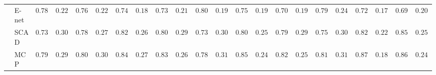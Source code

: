 \begin{tabular}{p{0.2cm}p{1cm}|p{0.6cm}p{0.6cm}|p{0.6cm}p{0.6cm}p{0.6cm}p{0.6cm}p{0.6cm}p{0.6cm}|p{0.6cm}p{0.6cm}p{0.6cm}p{0.6cm}p{0.6cm}p{0.6cm}|p{0.6cm}p{0.6cm}p{0.6cm}p{0.6cm}p{0.6cm}p{0.6cm}}
 & E-net  & $0.7867$ & $0.2261$ & $0.7600$ & $0.2214$ & $0.7467$ & $0.1857$ & $0.7300$ & $0.2142$ & $0.8067$ & $0.1935$ & $0.7533$ & $0.1975$ & $0.7083$ & $0.1944$ & $0.7917$ & $0.2489$ & $0.7250$ & $0.1794$ & $0.6967$ & $0.2084$ \\
 & SCAD  & $0.7383$ & $0.3091$ & $0.7800$ & $0.2761$ & $0.8250$ & $0.2631$ & $0.8083$ & $0.2905$ & $0.7367$ & $0.3099$ & $0.8033$ & $0.2577$ & $0.7900$ & $0.2955$ & $0.7533$ & $0.3057$ & $0.8217$ & $0.2213$ & $0.8500$ & $0.2557$ \\
 & MCP  & $0.7967$ & $0.2955$ & $0.8033$ & $0.3009$ & $0.8483$ & $0.2733$ & $0.8333$ & $0.2638$ & $0.7800$ & $0.3186$ & $0.8500$ & $0.2445$ & $0.8217$ & $0.2587$ & $0.8117$ & $0.3131$ & $0.8750$ & $0.1886$ & $0.8600$ & $0.2436$ \\
\hline 
\end{tabular}

